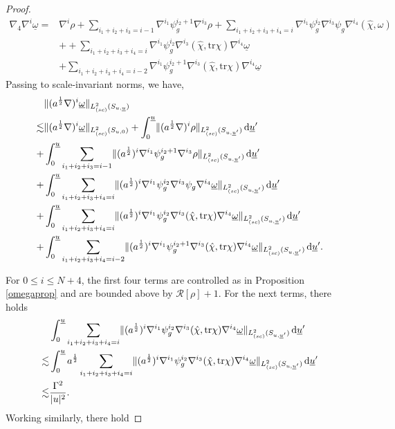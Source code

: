\documentclass{amsart}
\newcommand{\aln}{(\al \nabla)^i}
\newcommand{\omegabar}{\underline{\omega}}
\newcommand{\dubarprime}{\hspace{.5mm} \text{d} \ubar^{\prime}}
\newcommand{\intubar}{\int_0^{\ubar}}
\newcommand{\chihat}{\hat{\chi}}
\newcommand{\al}{a^{\frac{1}{2}}}
\newcommand{\ubar}{\underline{u}}
\newcommand{\sumif}{\sum_{i_1+i_2+i_3+i_4=i}}
\newcommand{\sumifim}{\sum_{i_1+i_2+i_3+i_4=i-2}}
\newcommand{\scaletwoSu}[1]{\lVert{#1} \rVert_{L^2_{(sc)}(S_{u,\ubar})}}
\newcommand{\scaletwoSuubarprime}[1]{\lVert{#1} \rVert_{L^2_{(sc)}(S_{u,\ubar^\prime})}}
\newcommand{\tr}{\mbox{tr}}
\begin{document}
{\begin{proof}
\begin{equation}
    \begin{split}
        \nabla_4 \nabla^i \omegabar  = &\nabla^i\rho + \sum_{i_1+i_2+i_3=i-1}\nabla^{i_1}\psi_g^{i_2+1}\nabla^{i_3}\rho+ \sum_{i_1+i_2+i_3+i_4=i} \nabla^{i_1}\psi_g^{i_2}\nabla^{i_3}\psi_g \nabla^{i_4}(\chihat,\omega)  \\ &+ +\sum_{i_1+i_2+i_3+i_4=i} \nabla^{i_1}\psi_g^{i_2} \nabla^{i_3}(\chihat,\tr\chi)\nabla^{i_4}\omegabar\\&+ \sum_{i_1+i_2+i_3+i_4=i-2}\nabla^{i_1}\psi_g^{i_2+1}\nabla^{i_3}(\chihat,\tr\chi)\nabla^{i_4}\omegabar%
    \end{split}
\end{equation}
Passing to scale-invariant norms, we have,
\begin{equation}
    \begin{split}
        &\scaletwoSu{\aln\omegabar}\\ \lesssim &\lVert \aln \omegabar \rVert_{L^2_{(sc)}(S_{u,0})}+\intubar \scaletwoSuubarprime{\aln  \rho} \dubarprime \\+ &\intubar \sum_{i_1+i_2+i_3=i-1} \scaletwoSuubarprime{(\al)^i\nabla^{i_1}\psi_g^{i_2+1}\nabla^{i_3}\rho} \dubarprime \\+&\intubar \sumif \scaletwoSuubarprime{(\al)^i\nabla^{i_1}\psi_g^{i_2}\nabla^{i_3}\psi_g \nabla^{i_4}\omegabar}\dubarprime \\+&\intubar\sumif \scaletwoSuubarprime{(\al)^i\nabla^{i_1}\psi_g^{i_2}\nabla^{i_3}(\chihat,\tr\chi)\nabla^{i_4}\omegabar }\dubarprime \\+&\intubar\sumifim \scaletwoSuubarprime{(\al)^i\nabla^{i_1}\psi_g^{i_2+1}\nabla^{i_3}(\chihat,\tr\chi)\nabla^{i_4}\omegabar}\dubarprime.
    \end{split}
\end{equation}

\noindent For $0\leq i \leq N+4$, the first four terms are controlled as in Proposition \ref{omegaprop} and are bounded above by $\mathcal{R}[\rho]+1$. For the next terms, there holds
\begin{equation}
    \begin{split}
        &\intubar\sumif \scaletwoSuubarprime{(\al)^i\nabla^{i_1}\psi_g^{i_2}\nabla^{i_3}(\chihat,\tr\chi)\nabla^{i_4}\omegabar }\dubarprime \\ \lesssim &\intubar \al \sumif \scaletwoSuubarprime{(\al)^i\nabla^{i_1}\psi_g^{i_2}\nabla^{i_3}(\chihat,\tr\chi)\nabla^{i_4}\omegabar }\dubarprime \\ \lesssim &\frac{\Gamma^2}{\lvert u \rvert^{2}}.
    \end{split}
\end{equation}Working similarly, there hold


\end{proof}}
\end{document}
